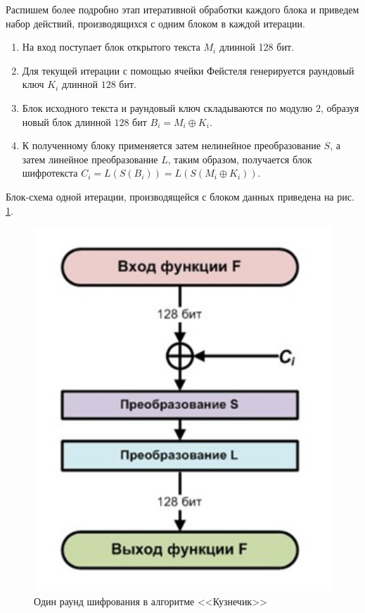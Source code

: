 \documentclass[a4paper, 12pt]{article}
\begin{document}
    Распишем более подробно этап итеративной обработки каждого блока и приведем
    набор действий, производящихся с одним блоком в каждой итерации.

    \begin{enumerate}
        \item На вход поступает блок открытого текста $M_i$ длинной 128 бит.
        \item Для текущей итерации с помощью ячейки Фейстеля генерируется раундовый ключ $K_i$ длинной $128$ бит.
        \item Блок исходного текста и раундовый ключ складываются по модулю $2$, образуя новый блок длинной $128$ бит $B_i = M_i \oplus K_i$.
        \item К полученному блоку применяется затем нелинейное преобразование $S$, а затем линейное преобразование $L$, таким образом, получается блок шифротекста $C_i = L(S(B_i)) = L(S(M_i \oplus K_i))$.
    \end{enumerate}

    Блок-схема одной итерации, производящейся с блоком данных приведена на рис. \ref{fig:AlgorithBlockScheme}.

    \begin{figure}
        \centering
        \includegraphics{images/AlgorithBlockScheme.png}
        \caption{Один раунд шифрования в алгоритме <<Кузнечик>>}
        \label{fig:AlgorithBlockScheme}
    \end{figure}
\end{document}
